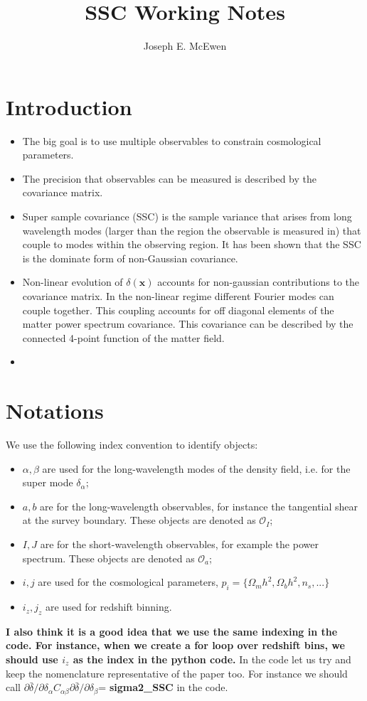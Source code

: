 \documentclass[11pt, oneside]{article}   	%
\title{SSC Working Notes }
\author{Joseph E. McEwen}
\newcommand{\obs}{\mathcal{O}}
\begin{document}
\maketitle

\section{Introduction} 
\begin{itemize}
\item{The big goal is to use multiple observables to constrain cosmological parameters. }
\item{The precision that observables can be measured is described by the covariance matrix.}
\item{Super sample covariance (SSC) is the sample variance that arises from long wavelength modes (larger than the region the observable is measured in) that couple to modes within the observing region. It has been shown that the SSC is the dominate form of non-Gaussian covariance.}
\item{Non-linear evolution of $\delta(\mathbf{x})$ accounts for non-gaussian contributions to the covariance matrix. In the non-linear regime different Fourier modes can couple together. This coupling accounts for off diagonal elements of the matter power spectrum covariance. This covariance can be described by the connected 4-point function of the matter field.}
\item{}
\end{itemize}



\section{Notations}
We use the following index convention to identify objects:
\begin{itemize}
\item{$\alpha, \beta$ are used for the long-wavelength modes of the density field, i.e. for the super mode $\delta_\alpha$;}
\item{$a, b$ are for the long-wavelength observables, for instance the tangential shear at the survey boundary. These objects are denoted as $\obs_I$;}
\item{$I,J$ are for the short-wavelength observables, for example the power spectrum. These objects are denoted as $\obs_a$; }
\item{$i,j$ are used for the cosmological parameters, $p_i=\{ \Omega_mh^2, \Omega_bh^2, n_s ,...\} $} 
\item{$i_z, j_z$ are used for redshift binning.}
\end{itemize} 
\textbf{I also think it is a good idea that we use the same indexing in the code. For instance, when we create a for loop over redshift bins, we should use $i_z$ as the index in the python code.}
In the code let us try and keep the nomenclature representative of the paper too. For instance we should call $\partial \bar{\delta}/ \partial \delta_\alpha C_{\alpha \beta} \partial \bar{\delta}/ \partial \delta_\beta$= \textbf{sigma2\_SSC} in the code. 
\end{document}
